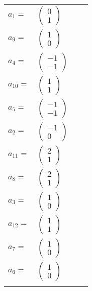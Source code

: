 \documentclass[1p]{elsarticle_modified}
\theoremstyle{definition}
\begin{document}
\begin{tabular}{m{7pt} m{180pt} m{7pt} m{180pt} }
\flushright $a_{1}=$&$\begin{pmatrix}0\\1\end{pmatrix}$ \\
\flushright $a_{9}=$&$\begin{pmatrix}1\\0\end{pmatrix}$ \\
\flushright $a_{4}=$&$\begin{pmatrix}-1\\-1\end{pmatrix}$ \\
\flushright $a_{10}=$&$\begin{pmatrix}1\\1\end{pmatrix}$ \\
\flushright $a_{5}=$&$\begin{pmatrix}-1\\-1\end{pmatrix}$ \\
\flushright $a_{2}=$&$\begin{pmatrix}-1\\0\end{pmatrix}$ \\
\flushright $a_{11}=$&$\begin{pmatrix}2\\1\end{pmatrix}$ \\
\flushright $a_{8}=$&$\begin{pmatrix}2\\1\end{pmatrix}$ \\
\flushright $a_{3}=$&$\begin{pmatrix}1\\0\end{pmatrix}$ \\
\flushright $a_{12}=$&$\begin{pmatrix}1\\1\end{pmatrix}$ \\
\flushright $a_{7}=$&$\begin{pmatrix}1\\0\end{pmatrix}$ \\
\flushright $a_{6}=$&$\begin{pmatrix}1\\0\end{pmatrix}$\\&\end{tabular}
\end{document}
